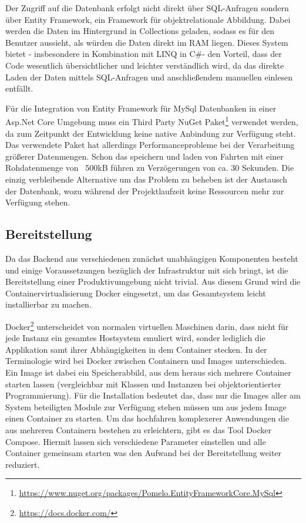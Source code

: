 Der Zugriff auf die Datenbank erfolgt nicht direkt über SQL-Anfragen sondern über Entity Framework, ein Framework für objektrelationale Abbildung. Dabei werden die Daten im Hintergrund in Collections geladen, sodass es für den Benutzer aussieht, als würden die Daten direkt im RAM liegen. Dieses System bietet - insbesondere in Kombination mit \ac{LINQ} in C\#- den Vorteil, dass der Code wesentlich übersichtlicher und leichter verständlich wird, da das direkte Laden der Daten mittels SQL-Anfragen und anschließendem manuellen einlesen entfällt.

Für die Integration von Entity Framework für MySql Datenbanken in einer Asp.Net Core Umgebung muss ein Third Party NuGet Paket\footnote{\url{https://www.nuget.org/packages/Pomelo.EntityFrameworkCore.MySql}} verwendet werden, da zum Zeitpunkt der Entwicklung keine native Anbindung zur Verfügung steht. Das verwendete Paket hat allerdings Performanceprobleme bei der Verarbeitung größerer Datenmengen. Schon das speichern und laden von Fahrten mit einer Rohdatenmenge von ~500kB führen zu Verzögerungen von ca. 30 Sekunden. Die einzig verbleibende Alternative um das Problem zu beheben ist der Austausch der Datenbank, wozu während der Projektlaufzeit keine Ressourcen mehr zur Verfügung stehen.

\subsection{Bereitstellung}
\label{sec:backendDeployment}
Da das Backend aus verschiedenen zunächst unabhängigen Komponenten besteht und einige Voraussetzungen bezüglich der Infrastruktur mit sich bringt, ist die Bereitstellung einer Produktivumgebung nicht trivial. 
Aus diesem Grund wird die Containervirtualisierung Docker eingesetzt, um das Gesamtsystem leicht installierbar zu machen.

Docker\footnote{\url{https://docs.docker.com/}} unterscheidet von normalen virtuellen Maschinen darin, dass nicht für jede Instanz ein gesamtes Hostsystem emuliert wird, sonder lediglich die Applikation samt ihrer Abhängigkeiten in dem Container stecken. In der Terminologie wird bei Docker zwischen Containern und Images unterschieden. Ein Image ist dabei ein Speicherabbild, aus dem heraus sich mehrere Container starten lassen (vergleichbar mit Klassen und Instanzen bei objektorientierter Programmierung). Für die Installation bedeutet das, dass nur die Images aller am System beteiligten Module zur Verfügung stehen müssen um aus jedem Image einen Container zu starten. Um das hochfahren komplexerer Anwendungen die aus mehreren Containern bestehen zu erleichtern, gibt es das Tool Docker Compose. Hiermit lassen sich verschiedene Parameter einstellen und alle Container gemeinsam starten was den Aufwand bei der Bereitstellung weiter reduziert. 

